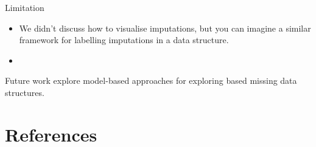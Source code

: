 \documentclass[]{article}
\begin{document}
Limitation

\begin{itemize}
\item
  We didn't discuss how to visualise imputations, but you can imagine a
  similar framework for labelling imputations in a data structure.
\item
\end{itemize}

Future work explore model-based approaches for exploring based missing
data structures.

\section{References}\label{references}
\end{document}
